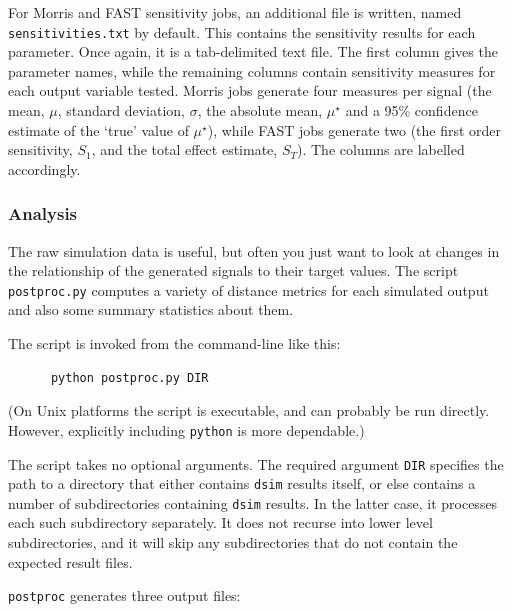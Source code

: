 \documentclass[a4paper,11pt]{article}
\begin{document}
For Morris and FAST sensitivity jobs, an additional file is written, named \texttt{sensitivities.txt} by default. This contains the sensitivity results for each parameter. Once again, it is a tab-delimited text file. The first column gives the parameter names, while the remaining columns contain sensitivity measures for each output variable tested. Morris jobs generate four measures per signal (the mean, $\mu$, standard deviation, $\sigma$, the absolute mean, $\mu^{\star}$ and a 95\% confidence estimate of the `true' value of $\mu^{\star}$), while FAST jobs generate two (the first order sensitivity, $S_1$, and the total effect estimate, $S_T$). The columns are labelled accordingly.

\subsubsection*{Analysis}

The raw simulation data is useful, but often you just want to look at changes in the relationship of the generated signals to their target values. The script \texttt{postproc.py} computes a variety of distance metrics for each simulated output and also some summary statistics about them.

The script is invoked from the command-line like this:
\begin{verbatim}
      python postproc.py DIR
\end{verbatim}
(On Unix platforms the script is executable, and can probably be run directly. However, explicitly including \texttt{python} is more dependable.)

The script takes no optional arguments. The required argument \texttt{DIR} specifies the path to a directory that either contains \texttt{dsim} results itself, or else contains a number of subdirectories containing \texttt{dsim} results. In the latter case, it processes each such subdirectory separately. It does not recurse into lower level subdirectories, and it will skip any subdirectories that do not contain the expected result files.

\texttt{postproc} generates three output files:
\end{document}
